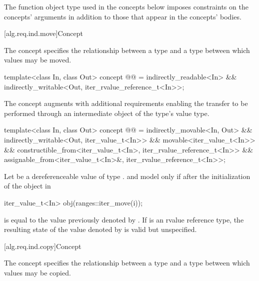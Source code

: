 \pnum
\begin{note}
The  function object type
used in the concepts below imposes constraints on the concepts' arguments
in addition to those that appear in the concepts' bodies.
\end{note}

[alg.req.ind.move]{Concept }

\pnum
The  concept specifies the relationship between
a  type and a  type
between which values may be moved.

\begin{codeblock}
template<class In, class Out>
  concept @@ =
    indirectly_readable<In> &&
    indirectly_writable<Out, iter_rvalue_reference_t<In>>;
\end{codeblock}

\pnum
The  concept augments
 with additional requirements enabling
the transfer to be performed through an intermediate object of the
 type's value type.

\begin{codeblock}
template<class In, class Out>
  concept @@ =
    indirectly_movable<In, Out> &&
    indirectly_writable<Out, iter_value_t<In>> &&
    movable<iter_value_t<In>> &&
    constructible_from<iter_value_t<In>, iter_rvalue_reference_t<In>> &&
    assignable_from<iter_value_t<In>&, iter_rvalue_reference_t<In>>;
\end{codeblock}

\pnum
Let  be a dereferenceable value of type .
 and  model 
only if after the initialization of the object  in
\begin{codeblock}
iter_value_t<In> obj(ranges::iter_move(i));
\end{codeblock}
 is equal to the value previously denoted by . If
 is an rvalue reference type,
the resulting state of the value denoted by  is
valid but unspecified.

[alg.req.ind.copy]{Concept }

\pnum
The  concept specifies the relationship between
a  type and a  type
between which values may be copied.

